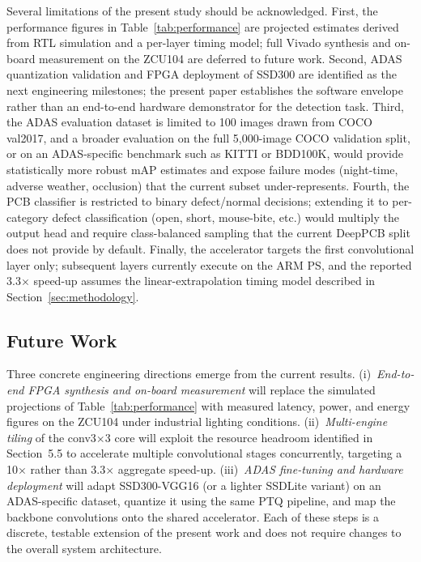 \documentclass[conference]{IEEEtran}
\begin{document}
Several limitations of the present study should be acknowledged. First, the performance figures in Table~\ref{tab:performance} are projected estimates derived from RTL simulation and a per-layer timing model; full Vivado synthesis and on-board measurement on the ZCU104 are deferred to future work. Second, ADAS quantization validation and FPGA deployment of SSD300 are identified as the next engineering milestones; the present paper establishes the software envelope rather than an end-to-end hardware demonstrator for the detection task. Third, the ADAS evaluation dataset is limited to 100 images drawn from COCO val2017, and a broader evaluation on the full 5{,}000-image COCO validation split, or on an ADAS-specific benchmark such as KITTI or BDD100K, would provide statistically more robust mAP estimates and expose failure modes (night-time, adverse weather, occlusion) that the current subset under-represents. Fourth, the PCB classifier is restricted to binary defect/normal decisions; extending it to per-category defect classification (open, short, mouse-bite, etc.) would multiply the output head and require class-balanced sampling that the current DeepPCB split does not provide by default. Finally, the accelerator targets the first convolutional layer only; subsequent layers currently execute on the ARM PS, and the reported 3.3$\times$ speed-up assumes the linear-extrapolation timing model described in Section~\ref{sec:methodology}.

\subsection{Future Work}

Three concrete engineering directions emerge from the current results. (i)~\textit{End-to-end FPGA synthesis and on-board measurement} will replace the simulated projections of Table~\ref{tab:performance} with measured latency, power, and energy figures on the ZCU104 under industrial lighting conditions. (ii)~\textit{Multi-engine tiling} of the conv3$\times$3 core will exploit the resource headroom identified in Section~5.5 to accelerate multiple convolutional stages concurrently, targeting a 10$\times$ rather than 3.3$\times$ aggregate speed-up. (iii)~\textit{ADAS fine-tuning and hardware deployment} will adapt SSD300-VGG16 (or a lighter SSDLite variant) on an ADAS-specific dataset, quantize it using the same PTQ pipeline, and map the backbone convolutions onto the shared accelerator. Each of these steps is a discrete, testable extension of the present work and does not require changes to the overall system architecture.
\end{document}
